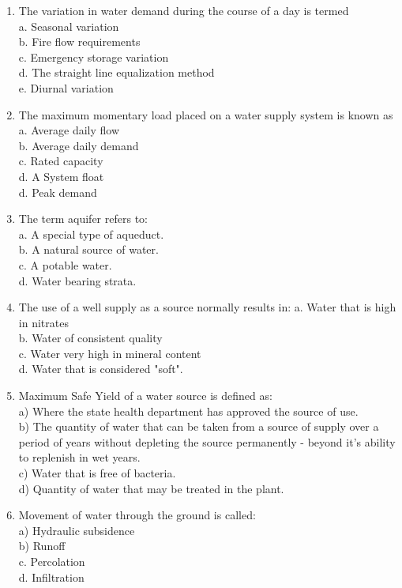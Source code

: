 \begin{enumerate}
\item The variation in water demand during the course of a day is termed\\
a. Seasonal variation\\
b. Fire flow requirements\\
c. Emergency storage variation\\
d. The straight line equalization method\\
e. Diurnal variation\\

\item The maximum momentary load placed on a water supply system is known as\\
a. Average daily flow\\
b. Average daily demand\\
c. Rated capacity\\
d. A System float\\
d. Peak demand

\item The term aquifer refers to:\\
a. A special type of aqueduct.\\
b. A natural source of water.\\
c. A potable water.\\
d. Water bearing strata.\\


\item The use of a well supply as a source normally results in:
a. Water that is high in nitrates\\
b. Water of consistent quality\\
c. Water very high in mineral content\\
d. Water that is considered "soft".\\


\item Maximum Safe Yield of a water source is defined as:\\
a) Where the state health department has approved the source of use.\\
b) The quantity of water that can be taken from a source of supply over a period of years without depleting the source permanently - beyond it's ability to replenish in wet years.\\
c) Water that is free of bacteria.\\
d) Quantity of water that may be treated in the plant.\\

\item Movement of water through the ground is called:\\
a) Hydraulic subsidence\\
b) Runoff\\
c. Percolation\\
d. Infiltration\\


\end{enumerate}
